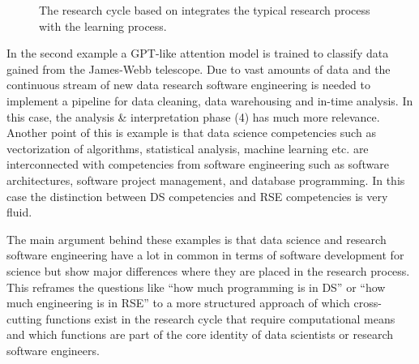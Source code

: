 \documentclass[
        english,biblatex
    ]{lni}
\begin{document}
    \begin{figure}


    \caption{\label{fig-research_cycle}The research cycle based on
    \autocite{wildt2009forschendes} integrates the typical research
    process with the learning process.}

    \end{figure}%

    In the second example a GPT-like attention model is trained to
    classify data gained from the James-Webb telescope. Due to vast
    amounts of data and the continuous stream of new data research
    software engineering is needed to implement a pipeline for data
    cleaning, data warehousing and in-time analysis. In this case, the
    analysis \& interpretation phase (4) has much more relevance.
    Another point of this is example is that data science competencies
    such as vectorization of algorithms, statistical analysis, machine
    learning etc. are interconnected with competencies from software
    engineering such as software architectures, software project
    management, and database programming. In this case the distinction
    between DS competencies and RSE competencies is very fluid.

    The main argument behind these examples is that data science and
    research software engineering have a lot in common in terms of
    software development for science but show major differences where
    they are placed in the research process. This reframes the questions
    like ``how much programming is in DS'' or ``how much engineering is
    in RSE'' to a more structured approach of which cross-cutting
    functions exist in the research cycle that require computational
    means and which functions are part of the core identity of data
    scientists or research software engineers.
\end{document}
